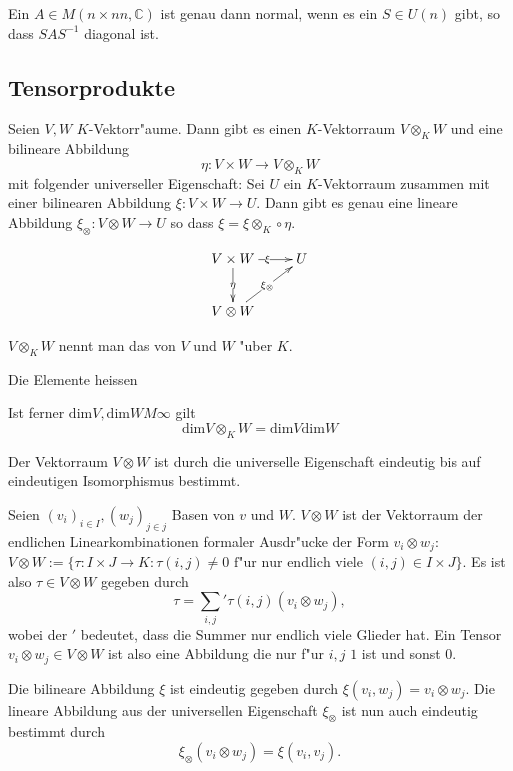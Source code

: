 \documentclass[11pt, a4paper]{article}
\begin{document}
\begin{corollary}
Ein $A \in M (n \times nn, \mathbb{C})$ ist genau dann normal, wenn es ein $S \in U(n)$ gibt, so dass $SAS^{-1}$ diagonal ist.
\end{corollary}



\subsection{Tensorprodukte}

\begin{theorem}
Seien $V, W$ $K$-Vektorr"aume. Dann gibt es einen $K$-Vektorraum $V \otimes_K W$ und eine bilineare Abbildung 
$$
\eta: V \times W \rightarrow V \otimes_K W
$$
mit folgender universeller Eigenschaft: Sei $U$ ein $K$-Vektorraum zusammen mit einer bilinearen Abbildung $\xi: V \times W \rightarrow U$. Dann gibt es genau eine lineare Abbildung $\xi_\otimes: V \otimes W \rightarrow U$ so dass $\xi = \xi\otimes_K \circ \eta$.

\begin{gather*}
  \xymatrix{V \times W  \ar[d]|{\eta} \ar[r]|{\xi} & U\\
    V \otimes W \ar[ur]|{\xi_\otimes} & }
\end{gather*}

$V \otimes_K W$ nennt man das  von $V$ und $W$ "uber $K$.

Die Elemente heissen 

Ist ferner $\mathrm{dim}V, \mathrm{dim}W M \infty$ gilt
$$
\mathrm{dim}V \otimes_K W = \mathrm{dim}V \mathrm{dim}W
$$
\end{theorem}


\begin{remark}
Der Vektorraum $V \otimes W$ ist durch die universelle Eigenschaft eindeutig bis auf eindeutigen Isomorphismus bestimmt. 
\end{remark}

\begin{remark}
Seien $(v_i)_{i \in I}, (w_j)_{j \in j}$ Basen von $v$ und $W$.
$V \otimes W$ ist der Vektorraum der endlichen Linearkombinationen formaler Ausdr"ucke der Form $v_i \otimes w_j$:
$V \otimes W := \{ \tau:  I \times J \rightarrow K : \tau(i, j) \neq 0 \text{ f"ur nur endlich viele } (i, j) \in I \times J \}$.
Es ist also $\tau \in V \otimes W$ gegeben durch 
$$
\tau = \sum\limits_{i, j} ' \tau(i, j) (v_i \otimes w_j),
$$
wobei der $'$ bedeutet, dass die Summer nur endlich viele Glieder hat.
Ein Tensor $v_i \otimes w_j \in V \otimes W$ ist also eine Abbildung die nur f"ur $i, j$ $1$ ist und sonst $0$.

Die bilineare Abbildung $\xi$ ist eindeutig gegeben durch $\xi(v_i, w_j) = v_i \otimes w_j$.
Die lineare Abbildung aus der universellen Eigenschaft $\xi_\otimes$ ist nun auch eindeutig bestimmt durch 
$$
\xi_\otimes(v_i \otimes w_j) = \xi(v_i, v_j).
$$
\end{remark}
\end{document}
